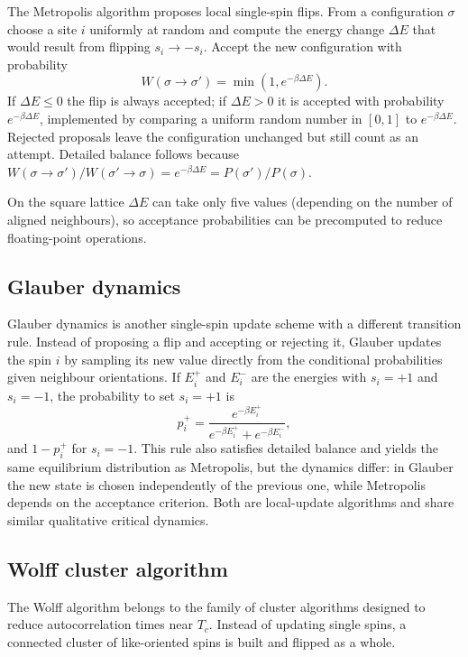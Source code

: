 The Metropolis algorithm \citep{Metropolis1953} proposes local single-spin flips. From a configuration $\sigma$ choose a site $i$ uniformly at random and compute the energy change $\Delta E$ that would result from flipping $s_i\to- s_i$. Accept the new configuration with probability
\[ W(\sigma\to\sigma')=\min\left(1,e^{-\beta\Delta E}\right). \]
If $\Delta E\le0$ the flip is always accepted; if $\Delta E>0$ it is accepted with probability $e^{-\beta\Delta E}$, implemented by comparing a uniform random number in $[0,1]$ to $e^{-\beta\Delta E}$. Rejected proposals leave the configuration unchanged but still count as an attempt. Detailed balance follows because $W(\sigma\to\sigma')/W(\sigma'\to\sigma)=e^{-\beta\Delta E}=P(\sigma')/P(\sigma)$.

On the square lattice $\Delta E$ can take only five values (depending on the number of aligned neighbours), so acceptance probabilities can be precomputed to reduce floating-point operations.

\subsection{Glauber dynamics}

Glauber dynamics \citep{Glauber1963} is another single-spin update scheme with a different transition rule. Instead of proposing a flip and accepting or rejecting it, Glauber updates the spin $i$ by sampling its new value directly from the conditional probabilities given neighbour orientations. If $E_i^+$ and $E_i^-$ are the energies with $s_i=+1$ and $s_i=-1$, the probability to set $s_i=+1$ is
\[ p_i^+ = \frac{e^{-\beta E_i^+}}{e^{-\beta E_i^+}+e^{-\beta E_i^-}}, \]
and $1-p_i^+$ for $s_i=-1$. This rule also satisfies detailed balance and yields the same equilibrium distribution as Metropolis, but the dynamics differ: in Glauber the new state is chosen independently of the previous one, while Metropolis depends on the acceptance criterion. Both are local-update algorithms and share similar qualitative critical dynamics.

\subsection{Wolff cluster algorithm}

The Wolff algorithm \citep{Wolff1989} belongs to the family of cluster algorithms designed to reduce autocorrelation times near $T_c$. Instead of updating single spins, a connected cluster of like-oriented spins is built and flipped as a whole.

